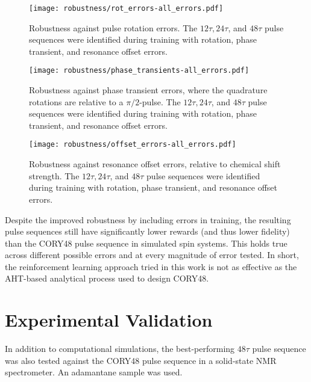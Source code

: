 \begin{figure}[H]
    \centering
    \texttt{[image: robustness/rot\_errors-all\_errors.pdf]}
    \caption{
    Robustness against pulse rotation errors. The $12\tau, 24\tau$, and $48\tau$ pulse sequences were identified during training with rotation, phase transient, and resonance offset errors.
    }
    \label{fig:rot_errors-all_errors}
\end{figure}

\begin{figure}[H]
    \centering
    \texttt{[image: robustness/phase\_transients-all\_errors.pdf]}
    \caption{
    Robustness against phase transient errors, where the quadrature rotations are relative to a $\pi/2$-pulse. The $12\tau, 24\tau$, and $48\tau$ pulse sequences were identified during training with rotation, phase transient, and resonance offset errors.
    }
    \label{fig:phase_transients-all_errors}
\end{figure}

\begin{figure}[H]
    \centering
    \texttt{[image: robustness/offset\_errors-all\_errors.pdf]}
    \caption{
    Robustness against resonance offset errors, relative to chemical shift strength. The $12\tau, 24\tau$, and $48\tau$ pulse sequences were identified during training with rotation, phase transient, and resonance offset errors.
    }
    \label{fig:offset_errors-all_errors}
\end{figure}

Despite the improved robustness by including errors in training, the resulting pulse sequences still have significantly lower rewards (and thus lower fidelity) than the CORY48 pulse sequence in simulated spin systems. This holds true across different possible errors and at every magnitude of error tested. In short, the reinforcement learning approach tried in this work is not as effective as the AHT-based analytical process used to design CORY48.



\section{Experimental Validation}\label{sec:experimental}

In addition to computational simulations, the best-performing $48\tau$ pulse sequence was also tested against the CORY48 pulse sequence in a solid-state NMR spectrometer.
An adamantane sample was used.


